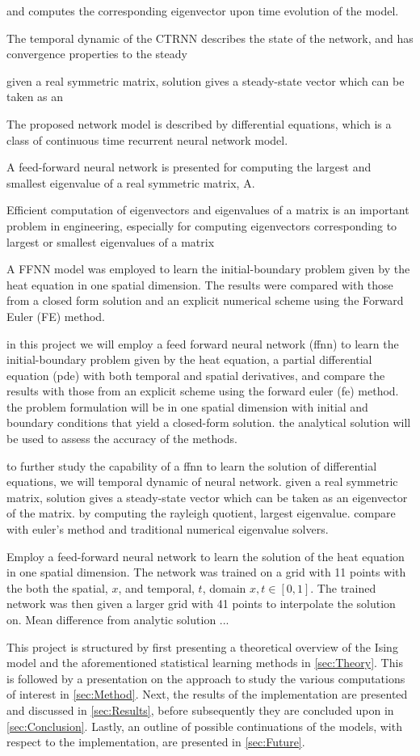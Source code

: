 
and computes the corresponding eigenvector upon time evolution of the model. 

The temporal dynamic of the CTRNN describes the state of the network, and has convergence properties to the steady  

given a real symmetric matrix, solution gives a steady-state vector which can be taken as an

The proposed network model is described by differential equations, which is a class of continuous time recurrent neural network model. 

A feed-forward neural network is presented for computing the largest and smallest eigenvalue of a real symmetric matrix, A.


Efficient computation of eigenvectors and eigenvalues of a matrix is an important problem in engineering, especially for computing eigenvectors corresponding to largest or smallest eigenvalues of a matrix

A FFNN model was employed to learn the initial-boundary problem given by the heat equation in one spatial dimension. The results were compared with those from a closed form solution and an explicit numerical scheme using the Forward Euler (FE) method.

in this project we will employ a feed forward neural network (ffnn) to learn the initial-boundary problem given by the heat equation, a partial differential equation (pde) with both temporal and spatial derivatives, and compare the results with those from an explicit scheme using the forward euler (fe) method. the problem formulation will be in one spatial dimension with initial and boundary conditions that yield a closed-form solution. the analytical solution will be used to assess the accuracy of the methods. 

to further study the capability of a ffnn to learn the solution of differential equations, we will 
temporal dynamic of neural network. given a real symmetric matrix, solution gives a steady-state vector which can be taken as an eigenvector of the matrix. by computing the rayleigh quotient, largest eigenvalue.
compare with euler's method and traditional numerical eigenvalue solvers.


Employ a feed-forward neural network to learn the solution of the heat equation in one spatial dimension. The network was trained on a grid with 11 points with the both the spatial, $x$, and temporal, $t$, domain $x, t \in [0,1]$. The trained network was then given a larger grid with 41 points to interpolate the solution on. Mean difference from analytic solution ...




This project is structured by first presenting a theoretical overview of the Ising model and the aforementioned statistical learning methods in \autoref{sec:Theory}. This is followed by a presentation on the approach to study the various computations of interest in \autoref{sec:Method}. Next, the results of the implementation are presented and discussed in \autoref{sec:Results}, before subsequently they are concluded upon in \autoref{sec:Conclusion}. Lastly, an outline of possible continuations of the models, with respect to the implementation, are presented in \autoref{sec:Future}.